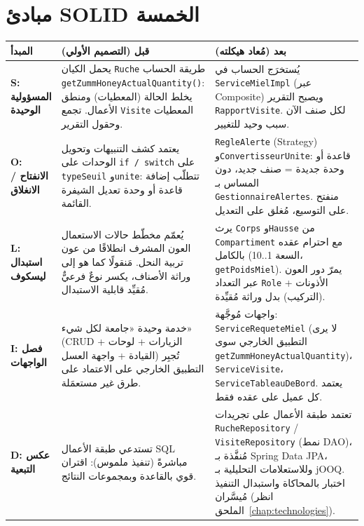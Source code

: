 \section{مبادئ SOLID الخمسة}
\begin{xltabular}{\textwidth}{>{\bfseries}p{2.4cm} p{6cm} X}
\toprule
\textbf{المبدأ} & \textbf{قبل (التصميم الأولي)} & \textbf{بعد (مُعاد هيكلته)} \\
\midrule
\endhead
S: المسؤولية الوحيدة &
يحمل الكيان \texttt{Ruche} طريقة الحساب \texttt{getZummHoneyActualQuantity()}:
يخلط الحالة (المعطيات) ومنطق الأعمال. تجمع \texttt{Visite} المعطيات وحقول
التقرير. &
يُستخرَج الحساب في \texttt{ServiceMielImpl} (عبر Composite) ويصبح التقرير
\texttt{RapportVisite}. لكل صنف الآن سبب وحيد للتغيير. \\
O: الانفتاح / الانغلاق &
يعتمد كشف التنبيهات وتحويل الوحدات على \texttt{if / switch} على
\texttt{typeSeuil} و\texttt{unite}: تتطلّب إضافة قاعدة أو وحدة تعديل الشيفرة
القائمة. &
\texttt{RegleAlerte} (Strategy) و\texttt{ConvertisseurUnite}: قاعدة أو وحدة
جديدة = صنف جديد، دون المساس بـ \texttt{GestionnaireAlertes}. منفتح على التوسيع،
مُغلق على التعديل. \\
L: استبدال ليسكوف &
يُعمّم مخطّط حالات الاستعمال العون المشرف انطلاقًا من عون تربية النحل. مَنقولًا
كما هو إلى وراثة الأصناف، يكسر نوعٌ فرعيٌّ مُقيِّد قابلية الاستبدال. &
يرث \texttt{Corps} و\texttt{Hausse} من \texttt{Compartiment} مع احترام عقده
بالكامل (السعة 1..10، \texttt{getPoidsMiel}). يمرّ دور العون عبر التعداد
\texttt{Role} + الأذونات (التركيب) بدل وراثة مُقيِّدة. \\
I: فصل الواجهات &
خدمة وحيدة «جامعة لكل شيء» (CRUD + الزيارات + لوحات القيادة + واجهة العسل)
تُجبِر التطبيق الخارجي على الاعتماد على طرق غير مستعمَلة. &
واجهات مُوجَّهة: \texttt{ServiceRequeteMiel} (لا يرى التطبيق الخارجي سوى
\texttt{getZummHoneyActualQuantity})، \texttt{ServiceVisite}،
\texttt{ServiceTableauDeBord}. يعتمد كل عميل على عقده فقط. \\
D: عكس التبعية &
تستدعي طبقة الأعمال SQL مباشرةً (تنفيذ ملموس): اقتران قوي بالقاعدة وبمجموعات
النتائج. &
تعتمد طبقة الأعمال على تجريدات \texttt{RucheRepository} /
\texttt{VisiteRepository} (نمط DAO)، مُنفَّذة بـ Spring Data JPA، وللاستعلامات
التحليلية بـ jOOQ. اختبار بالمحاكاة واستبدال التنفيذ مُيسَّران (انظر
الملحق~\ref{chap:technologies}). \\
\bottomrule
\end{xltabular}

